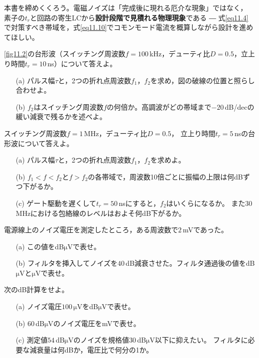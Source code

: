 \vspace{\baselineskip}
本書を締めくくろう。電磁ノイズは「完成後に現れる厄介な現象」ではなく，
素子の$t_r$と回路の寄生LCから\textbf{設計段階で見積れる物理現象}である ―
式\ref{eq11.4}で対策すべき帯域を，式\ref{eq11.10}でコモンモード電流を概算しながら設計を進めてほしい。

\begin{章末問題}
\item \label{ex11.1}\ref{fig11.2}の台形波（スイッチング周波数$f = 100$\,kHz，デューティ比$D = 0.5$，立上り時間$t_r = 10$\,ns）について答えよ。
\begin{enumerate}
\item[(a)] パルス幅$\tau$と，2つの折れ点周波数$f_1$，$f_2$を求め，図の破線の位置と照らし合わせよ。
\item[(b)] $f_2$はスイッチング周波数$f$の何倍か。高調波がどの帯域まで$-20$\,dB/decの緩い減衰で残るかを述べよ。
\end{enumerate}

\item \label{ex11.2}スイッチング周波数$f = 1$\,MHz，デューティ比$D = 0.5$，
立上り時間$t_r = 5$\,nsの台形波について答えよ。
\begin{enumerate}
\item[(a)] パルス幅$\tau$と，2つの折れ点周波数$f_1$，$f_2$を求めよ。
\item[(b)] $f_1 < f < f_2$と$f > f_2$の各帯域で，周波数10倍ごとに振幅の上限は何dBずつ下がるか。
\item[(c)] ゲート駆動を遅くして$t_r = 50$\,nsにすると，$f_2$はいくらになるか。
また$30$\,MHzにおける包絡線のレベルはおよそ何dB下がるか。
\end{enumerate}

\item \label{ex11.3}電源線上のノイズ電圧を測定したところ，ある周波数で$2$\,mVであった。
\begin{enumerate}
\item[(a)] この値をdB$\mathrm{\mu}$Vで表せ。
\item[(b)] フィルタを挿入してノイズを$40$\,dB減衰させた。フィルタ通過後の値をdB$\mathrm{\mu}$Vと$\mathrm{\mu V}$で表せ。
\end{enumerate}

\item \label{ex11.4}次のdB計算をせよ。
\begin{enumerate}
\item[(a)] ノイズ電圧$100\,\mathrm{\mu V}$をdB$\mathrm{\mu}$Vで表せ。
\item[(b)] $60$\,dB$\mathrm{\mu}$Vのノイズ電圧をmVで表せ。
\item[(c)] 測定値$54$\,dB$\mathrm{\mu}$Vのノイズを規格値$30$\,dB$\mathrm{\mu}$V以下に抑えたい。
フィルタに必要な減衰量は何dBか，電圧比で何分の1か。
\end{enumerate}


\end{章末問題}

